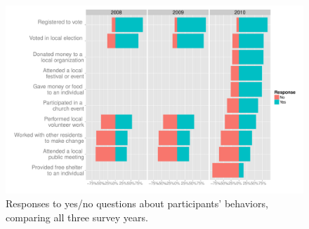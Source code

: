 \documentclass[smallextended]{svjour3}\usepackage[]{graphicx}\usepackage[]{color}
\newenvironment{knitrout}{}{} %
\begin{document}
\begin{knitrout}
\color{fgcolor}\begin{figure}

{\centering \includegraphics[width=0.99\linewidth]{figure/YNall-1} 

}

\caption[Responses to yes/no questions about participants' behaviors, comparing all three survey years]{Responses to yes/no questions about participants' behaviors, comparing all three survey years.}\label{fig:YNall}
\end{figure}


\end{knitrout}
\end{document}
